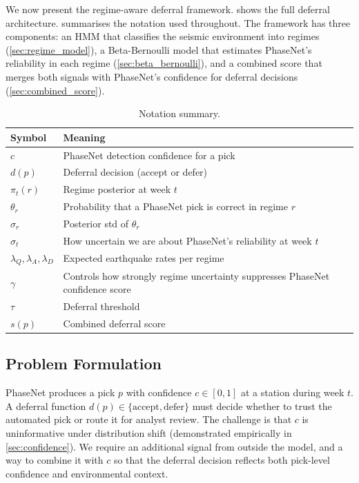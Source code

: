We now present the regime-aware deferral framework.  shows the full deferral architecture.  summarises the notation used throughout. The framework has three components: an HMM that classifies the seismic environment into regimes (\cref{sec:regime_model}), a Beta-Bernoulli model that estimates PhaseNet's reliability in each regime (\cref{sec:beta_bernoulli}), and a combined score that merges both signals with PhaseNet's confidence for deferral decisions (\cref{sec:combined_score}).

\begin{table}[t]
    \centering
    \caption{Notation summary.}
    \label{tab:notation}
    \small
    \begin{tabular}{@{}lp{5.2cm}@{}}
        \toprule
        Symbol & Meaning \\
        \midrule
        $c$ & PhaseNet detection confidence for a pick \\
        $d(p)$ & Deferral decision (accept or defer) \\
        $\pi_t(r)$ & Regime posterior at week $t$ \\
        $\theta_r$ & Probability that a PhaseNet pick is correct in regime $r$ \\
        $\sigma_r$ & Posterior std of $\theta_r$ \\
        $\sigma_t$ & How uncertain we are about PhaseNet's reliability at week $t$ \\
        $\lambda_Q, \lambda_A, \lambda_D$ & Expected earthquake rates per regime \\
        $\gamma$ & Controls how strongly regime uncertainty suppresses PhaseNet confidence score \\
        $\tau$ & Deferral threshold \\
        $s(p)$ & Combined deferral score \\
        \bottomrule
    \end{tabular}
\end{table}

\subsection{Problem Formulation}
\label{sec:problem}

PhaseNet produces a pick $p$ with confidence $c \in [0, 1]$ at a station during week $t$. A deferral function $d(p) \in \{\text{accept}, \text{defer}\}$ must decide whether to trust the automated pick or route it for analyst review. The challenge is that $c$ is uninformative under distribution shift (demonstrated empirically in \cref{sec:confidence}). We require an additional signal from outside the model, and a way to combine it with $c$ so that the deferral decision reflects both pick-level confidence and environmental context.

